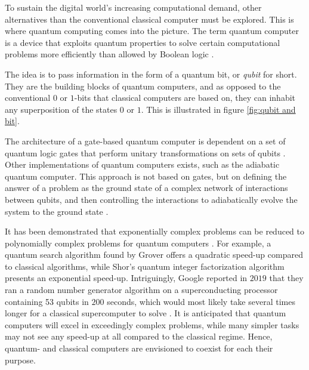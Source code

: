 To sustain the digital world's increasing computational demand, other alternatives than the conventional classical computer must be explored. This is where quantum computing comes into the picture. The term quantum computer is a device that exploits quantum properties to solve certain computational problems more efficiently than allowed by Boolean logic \cite{Weber2010}.

The idea is to pass information in the form of a quantum bit, or \textit{qubit} for short. They are the building blocks of quantum computers, and as opposed to the conventional $0$ or $1$-bits that classical computers are based on, they can inhabit any superposition of the states $0$ or $1$. This is illustrated in figure \ref{fig:qubit and bit}.


The architecture of a gate-based quantum computer is dependent on a set of quantum logic gates that perform unitary transformations on sets of qubits \cite{DiVincenzo2000, Ladd2010}. Other implementations of quantum computers exists, such as the adiabatic quantum computer. This approach is not based on gates, but on defining the answer of a problem as the ground state of a complex network of interactions between qubits, and then controlling the interactions to adiabatically evolve the system to the ground state \cite{Mizel2007}.



It has been demonstrated that exponentially complex problems can be reduced to polynomially complex problems for quantum computers \cite{Pavicic2006}. For example, a quantum search algorithm found by Grover \cite{Grover1997} offers a quadratic speed-up compared to classical algorithms, while Shor's quantum integer factorization algorithm \cite{Shor1994} presents an exponential speed-up. Intriguingly, Google reported in $2019$ that they ran a random number generator algorithm on a superconducting processor containing 53 qubits in $200$ seconds, which would most likely take several times longer for a classical supercomputer to solve \cite{Martinis2019}. It is anticipated that quantum computers will excel in exceedingly complex problems, while many simpler tasks may not see any speed-up at all compared to the classical regime. Hence, quantum- and classical computers are envisioned to coexist for each their purpose.


